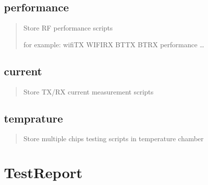 \documentclass[letterpaper,10pt,english]{sphinxhowto}
\begin{document}
\subsection{performance}
\label{\detokenize{testcase/index:performance}}\begin{quote}

Store RF performance scripts

for example: wifiTX WIFIRX BTTX BTRX performance …
\end{quote}


\subsection{current}
\label{\detokenize{testcase/index:current}}\begin{quote}

Store TX/RX current measurement scripts
\end{quote}


\subsection{temprature}
\label{\detokenize{testcase/index:temprature}}\begin{quote}

Store multiple chips testing scripts in temperature chamber
\end{quote}


\section{TestReport}
\label{\detokenize{testreport/index:testreport}}\label{\detokenize{testreport/index::doc}}

\renewcommand{\indexname}{Python 模块索引}
\begin{sphinxtheindex}
\let\bigletter\sphinxstyleindexlettergroup
\bigletter{a}
\item\relax{}
\indexspace
\bigletter{b}
\item\relax{}
\indexspace
\bigletter{c}
\item\relax{}
\indexspace
\bigletter{p}
\item\relax{}
\indexspace
\bigletter{r}
\item\relax{}
\indexspace
\bigletter{w}
\item\relax{}
\item\relax{}
\end{sphinxtheindex}

\renewcommand{\indexname}{索引}
\printindex
\end{document}
